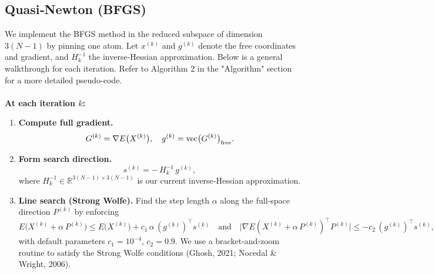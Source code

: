 \documentclass[11pt,onecolumn]{article}
\begin{document}
\subsection{Quasi‑Newton (BFGS)}
We implement the BFGS method in the reduced subspace of dimension $3(N-1)$ by pinning one atom. Let $x^{(k)}$ and $g^{(k)}$ denote the free coordinates and gradient, and $H_k^{-1}$ the inverse‑Hessian approximation. Below is a general walkthrough for each iteration. Refer to Algorithm 2 in the "Algorithm" section for a more detailed pseudo-code.\\
\\
\noindent
\textbf {At each iteration \(k\):}
\begin{enumerate}
  \item \textbf{Compute full gradient.}  
    \[
      G^{(k)} = \nabla E\bigl(X^{(k)}\bigr),
      \quad
      g^{(k)} = \text{vec}\bigl(G^{(k)}\bigr)_{\rm free}.
    \]
  \item \textbf{Form search direction.}  
    \[
      s^{(k)} = -\,H_k^{-1}\,g^{(k)},
    \]
    where \(H_k^{-1}\in\mathbb R^{3(N-1)\times3(N-1)}\) is our current inverse‑Hessian approximation.

\item \textbf{Line search (Strong Wolfe).}
    Find the step length $\alpha$ along the full‐space direction $P^{(k)}$ by enforcing
    \[
      E\bigl(X^{(k)} + \alpha\,P^{(k)}\bigr) \le E\bigl(X^{(k)}\bigr) + c_1\,\alpha\,(g^{(k)})^\top s^{(k)}
      \quad\text{and}\quad
      \bigl|\nabla E(X^{(k)} + \alpha\,P^{(k)})^\top P^{(k)}\bigr|
      \le -c_2\,(g^{(k)})^\top s^{(k)},
    \]
    with default parameters $c_1=10^{-4}$, $c_2=0.9$.  We use a bracket‐and‐zoom routine to satisfy the Strong Wolfe conditions (Ghosh, 2021; Nocedal \& Wright, 2006).





\end{enumerate}
\end{document}
